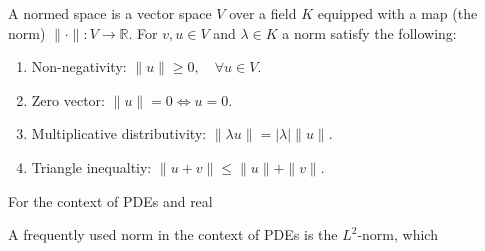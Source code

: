 A normed space is a vector space $V$ over a field $K$ equipped with a map (the norm) $\|\cdot\|: V \to \mathbb{R}$. 
For $v, u \in V$ and $\lambda \in K$ a norm satisfy the following:
\begin{enumerate}
    \item Non-negativity: $\|u\| \geq 0, \quad \forall u \in V$.
    \item Zero vector: $\|u\| = 0 \Leftrightarrow u = 0$.
    \item Multiplicative distributivity: $\|\lambda u\| = |\lambda|\|u\|$.
    \item Triangle inequaltiy: $\|u+v\| \leq \|u\|+\|v\|$.
\end{enumerate}
For the context of PDEs and real

A frequently used norm in the context of PDEs is the $L^2$-norm, which 